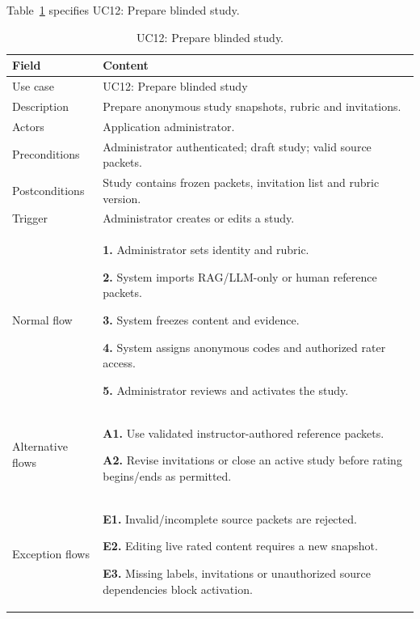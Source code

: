 \needspace{.39\textheight}
Table~\ref{tab:uc-12} specifies UC12: Prepare blinded study.
\begin{table}[H]\centering\footnotesize{}\renewcommand{\arraystretch}{1.05}
\caption{UC12: Prepare blinded study.}\label{tab:uc-12}
\begin{tabular}{|p{2.8cm}|p{11.9cm}|}\hline
\textbf{Field} & \textbf{Content}\\\hline
Use case & UC12: Prepare blinded study\\\hline
Description & Prepare anonymous study snapshots, rubric and invitations.\\\hline
Actors & Application administrator.\\\hline
Preconditions & Administrator authenticated; draft study; valid source packets.\\\hline
Postconditions & Study contains frozen packets, invitation list and rubric version.\\\hline
Trigger & Administrator creates or edits a study.\\\hline
Normal flow & \textbf{1.} Administrator sets identity and rubric.\par \textbf{2.} System imports RAG/LLM-only or human reference packets.\par \textbf{3.} System freezes content and evidence.\par \textbf{4.} System assigns anonymous codes and authorized rater access.\par \textbf{5.} Administrator reviews and activates the study.\\\hline
Alternative flows & \textbf{A1.} Use validated instructor-authored reference packets.\par \textbf{A2.} Revise invitations or close an active study before rating begins/ends as permitted.\\\hline
Exception flows & \textbf{E1.} Invalid/incomplete source packets are rejected.\par \textbf{E2.} Editing live rated content requires a new snapshot.\par \textbf{E3.} Missing labels, invitations or unauthorized source dependencies block activation.\\\hline
\end{tabular}\end{table}

